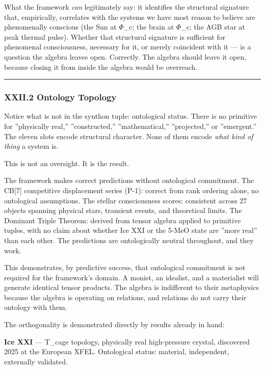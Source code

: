 \documentclass[12pt,a4paper]{article}
\begin{document}
What the framework \emph{can} legitimately say: it identifies the structural signature that, empirically, correlates with the systems we have most reason to believe are phenomenally conscious (the Sun at $\Phi$\_c; the brain at $\Phi$\_c; the AGB star at peak thermal pulse). Whether that structural signature is sufficient for phenomenal consciousness, necessary for it, or merely coincident with it --- is a question the algebra leaves open. Correctly. The algebra should leave it open, because closing it from inside the algebra would be overreach.

\begin{center}
\rule{0.5\textwidth}{0.4pt}
\end{center}

\subsubsection{XXII.2 Ontology \perp Topology}

Notice what is not in the synthon tuple: ontological status. There is no primitive for ''physically real,'' ''constructed,'' ''mathematical,'' ''projected,'' or ''emergent.'' The eleven slots encode structural character. None of them encode \emph{what kind of thing} a system is.

This is not an oversight. It is the result.

The framework makes correct predictions without ontological commitment. The CB{[}7{]} competitive displacement series (P-1): correct from rank ordering alone, no ontological assumptions. The stellar consciousness scores: consistent across 27 objects spanning physical stars, transient events, and theoretical limits. The Dominant Triple Theorem: derived from tensor algebra applied to primitive tuples, with no claim about whether Ice XXI or the 5-MeO state are ''more real'' than each other. The predictions are ontologically neutral throughout, and they work.

This demonstrates, by predictive success, that ontological commitment is not required for the framework's domain. A monist, an idealist, and a materialist will generate identical tensor products. The algebra is indifferent to their metaphysics because the algebra is operating on relations, and relations do not carry their ontology with them.

The orthogonality is demonstrated directly by results already in hand:

\textbf{Ice XXI} --- T\_cage topology, physically real high-pressure crystal, discovered 2025 at the European XFEL. Ontological status: material, independent, externally validated.
\end{document}

